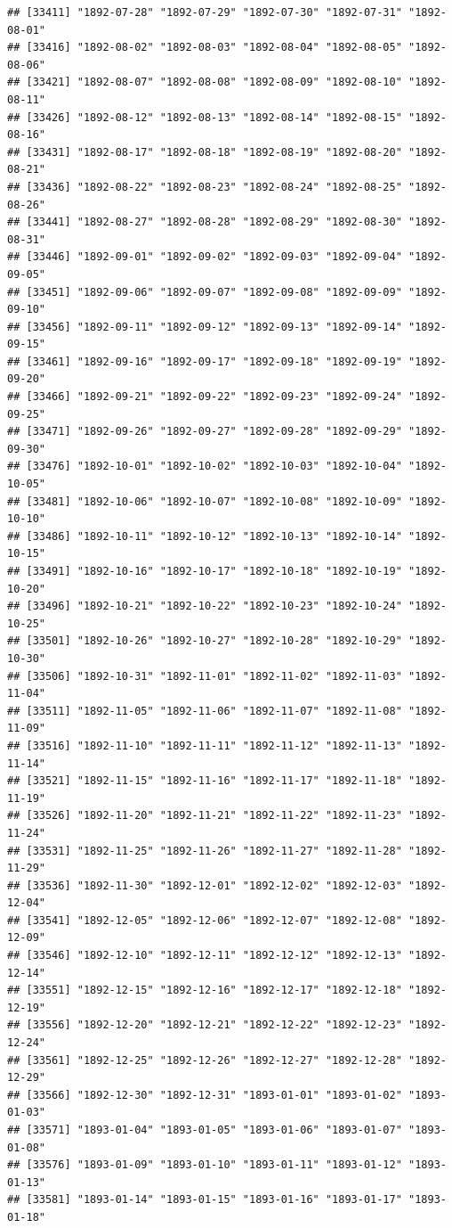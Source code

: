 \documentclass{article}\usepackage[]{graphicx}\usepackage[]{color}
\makeatletter
\newenvironment{kframe}{%
 \def\at@end@of@kframe{}%
 \ifinner\ifhmode%
  \def\at@end@of@kframe{\end{minipage}}%
  \begin{minipage}{\columnwidth}%
 \fi\fi%
 \def\FrameCommand##1{\hskip\@totalleftmargin \hskip-\fboxsep
 \colorbox{shadecolor}{##1}\hskip-\fboxsep
     \hskip-\linewidth \hskip-\@totalleftmargin \hskip\columnwidth}%
 \MakeFramed {\advance\hsize-\width
   \@totalleftmargin\z@ \linewidth\hsize
   \@setminipage}}%
 {\par\unskip\endMakeFramed%
 \at@end@of@kframe}
\newenvironment{knitrout}{}{} %
\makeatother
\begin{document}
\begin{description}
\begin{knitrout}
\begin{kframe}
\begin{verbatim}
## [33411] "1892-07-28" "1892-07-29" "1892-07-30" "1892-07-31" "1892-08-01"
## [33416] "1892-08-02" "1892-08-03" "1892-08-04" "1892-08-05" "1892-08-06"
## [33421] "1892-08-07" "1892-08-08" "1892-08-09" "1892-08-10" "1892-08-11"
## [33426] "1892-08-12" "1892-08-13" "1892-08-14" "1892-08-15" "1892-08-16"
## [33431] "1892-08-17" "1892-08-18" "1892-08-19" "1892-08-20" "1892-08-21"
## [33436] "1892-08-22" "1892-08-23" "1892-08-24" "1892-08-25" "1892-08-26"
## [33441] "1892-08-27" "1892-08-28" "1892-08-29" "1892-08-30" "1892-08-31"
## [33446] "1892-09-01" "1892-09-02" "1892-09-03" "1892-09-04" "1892-09-05"
## [33451] "1892-09-06" "1892-09-07" "1892-09-08" "1892-09-09" "1892-09-10"
## [33456] "1892-09-11" "1892-09-12" "1892-09-13" "1892-09-14" "1892-09-15"
## [33461] "1892-09-16" "1892-09-17" "1892-09-18" "1892-09-19" "1892-09-20"
## [33466] "1892-09-21" "1892-09-22" "1892-09-23" "1892-09-24" "1892-09-25"
## [33471] "1892-09-26" "1892-09-27" "1892-09-28" "1892-09-29" "1892-09-30"
## [33476] "1892-10-01" "1892-10-02" "1892-10-03" "1892-10-04" "1892-10-05"
## [33481] "1892-10-06" "1892-10-07" "1892-10-08" "1892-10-09" "1892-10-10"
## [33486] "1892-10-11" "1892-10-12" "1892-10-13" "1892-10-14" "1892-10-15"
## [33491] "1892-10-16" "1892-10-17" "1892-10-18" "1892-10-19" "1892-10-20"
## [33496] "1892-10-21" "1892-10-22" "1892-10-23" "1892-10-24" "1892-10-25"
## [33501] "1892-10-26" "1892-10-27" "1892-10-28" "1892-10-29" "1892-10-30"
## [33506] "1892-10-31" "1892-11-01" "1892-11-02" "1892-11-03" "1892-11-04"
## [33511] "1892-11-05" "1892-11-06" "1892-11-07" "1892-11-08" "1892-11-09"
## [33516] "1892-11-10" "1892-11-11" "1892-11-12" "1892-11-13" "1892-11-14"
## [33521] "1892-11-15" "1892-11-16" "1892-11-17" "1892-11-18" "1892-11-19"
## [33526] "1892-11-20" "1892-11-21" "1892-11-22" "1892-11-23" "1892-11-24"
## [33531] "1892-11-25" "1892-11-26" "1892-11-27" "1892-11-28" "1892-11-29"
## [33536] "1892-11-30" "1892-12-01" "1892-12-02" "1892-12-03" "1892-12-04"
## [33541] "1892-12-05" "1892-12-06" "1892-12-07" "1892-12-08" "1892-12-09"
## [33546] "1892-12-10" "1892-12-11" "1892-12-12" "1892-12-13" "1892-12-14"
## [33551] "1892-12-15" "1892-12-16" "1892-12-17" "1892-12-18" "1892-12-19"
## [33556] "1892-12-20" "1892-12-21" "1892-12-22" "1892-12-23" "1892-12-24"
## [33561] "1892-12-25" "1892-12-26" "1892-12-27" "1892-12-28" "1892-12-29"
## [33566] "1892-12-30" "1892-12-31" "1893-01-01" "1893-01-02" "1893-01-03"
## [33571] "1893-01-04" "1893-01-05" "1893-01-06" "1893-01-07" "1893-01-08"
## [33576] "1893-01-09" "1893-01-10" "1893-01-11" "1893-01-12" "1893-01-13"
## [33581] "1893-01-14" "1893-01-15" "1893-01-16" "1893-01-17" "1893-01-18"

\end{verbatim}
\end{kframe}
\end{knitrout}
\end{description}
\end{document}
